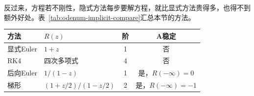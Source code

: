 反过来，方程若不刚性，隐式方法每步要解方程，就比显式方法贵得多，也得不到额外好处。表~\ref{tab:odenum-implicit-compare}汇总本节的方法。

\begin{BookInlineTable}
 \centering
 \caption{显式与隐式方法的对比，$z=h\lambda$。}
 \label{tab:odenum-implicit-compare}
 \begin{tabular}{llcc}
  \toprule
  方法 & $R(z)$ & 阶 & A稳定\\
  \midrule
  显式Euler & $1+z$ & 1 & 否\\
  RK4 & 四次多项式 & 4 & 否\\
  后向Euler & $1/(1-z)$ & 1 & 是，$R(-\infty)=0$\\
  梯形 & $(1+z/2)/(1-z/2)$ & 2 & 是，$R(-\infty)=-1$\\
  \bottomrule
 \end{tabular}
\end{BookInlineTable}

